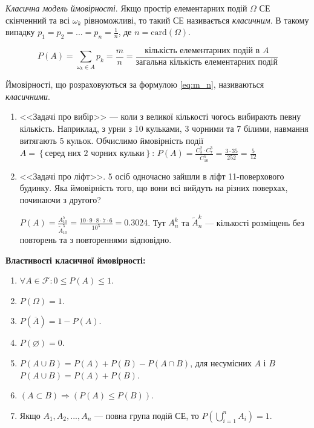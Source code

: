 \begin{example}
    \emph{Класична модель ймовірності}. Якщо простір елементарних подій $\Omega$ СЕ скінченний
    та всі $\omega_k$ рівноможливі, то такий СЕ називається \emph{класичним}.
    В такому випадку $p_1 = p_2 = ... = p_n = \frac{1}{n}$, де $n = \mathrm{card}(\Omega)$.
    
    \begin{equation}\label{eq:m_n}
        P(A) = \sum_{\omega_k \in A} p_k = \frac{m}{n} = \frac{\text{кількість елементарних подій в } A}{\text{загальна кількість елементарних подій}}
    \end{equation}
\end{example}
Ймовірності, що розраховуються за формулою \eqref{eq:m_n}, називаються \emph{класичними}.
\begin{example}
    \begin{enumerate}
        \item <<Задачі про вибір>> --- коли з великої кількості чогось вибирають певну кількість.
        Наприклад, з урни з 10 кульками, 3 чорними та 7 білими, навмання витягають 5 кульок.
        Обчислимо ймовірність події $A = \left\{ \text{серед них 2 чорних кульки}\right\}$:
        $P(A) = \frac{C_3^2\cdot C_7^3}{C_{10}^5} = \frac{3\cdot 35}{252} = \frac{5}{12}$
        \item <<Задачі про ліфт>>. 5 осіб одночасно зайшли в ліфт 11-поверхового будинку. 
        Яка ймовірність того, що вони всі вийдуть на різних поверхах, починаючи з другого?
        
        $P(A) = \frac{A_{10}^5}{\widetilde{A}_{10}^5} = \frac{10\cdot 9\cdot 8\cdot 7 \cdot 6}{10^5} = 0.3024$. 
        Тут $A_n^k$ та $\widetilde{A}_n^k$ --- кількості розміщень без повторень та з повтореннями відповідно.
    \end{enumerate}
\end{example}

\textbf{Властивості класичної ймовірності:}
\begin{enumerate}
    \item $\forall A \in \mathcal{F}: 0 \leq P(A) \leq 1$.
    \item $P(\Omega) = 1$.
    \item $P(\overline{A}) = 1 - P(A)$.
    \item $P(\varnothing) = 0$.
    \item $P(A\cup B) = P(A) + P(B) - P(A\cap B)$, для несумісних $A$ і $B$ $P(A\cup B) = P(A) + P(B)$.
    \item $\left( A \subset B\right) \Rightarrow \left( P(A) \leq P(B)\right)$.
    \item Якщо $A_1, A_2, ..., A_n$ --- повна група подій СЕ, то $P(\bigcup_{i=1}^{n} A_i) = 1$.
\end{enumerate}